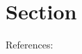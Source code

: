 \section{Section}
\label{sec:section}

References: \cite{knuth1984texbook,erdos1959random}

\lipsum[1]
